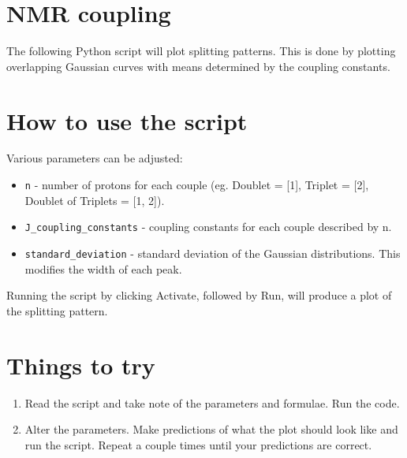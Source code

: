 \documentclass{article}
\begin{document}
\section{NMR coupling}

The following Python script will plot splitting patterns. This is done by plotting overlapping Gaussian curves with means determined by the coupling constants.

\section{How to use the script}
Various parameters can be adjusted: 
\begin{itemize}
\item \texttt{n} - number of protons for each couple (eg. Doublet = [1], Triplet = [2], Doublet of Triplets = [1, 2]).
\item \texttt{J\_coupling\_constants} - coupling constants for each couple described by n.
\item \texttt{standard\_deviation} - standard deviation of the Gaussian distributions. This modifies the width of each peak.
\end{itemize}
Running the script by clicking Activate, followed by Run, will produce a plot of the splitting pattern.

\section{Things to try}
\begin{enumerate}
\item Read the script and take note of the parameters and formulae. Run the code.
\item Alter the parameters. Make predictions of what the plot should look like and run the script. Repeat a couple times until your predictions are correct.
\end{enumerate}
\end{document}
